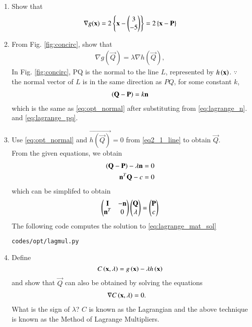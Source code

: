 \begin{enumerate}[label=\thesubsection.\arabic*.,ref=\thesubsection.\theenumi]
\item Show that 
\begin{align}
\nabla g(\mathbf{x}) = 2\left\{\mathbf{x}-\begin{pmatrix}3 \\ -5\end{pmatrix}\right\} = 2\left\{\mathbf{x}-\mathbf{P}\right\}
\label{eq:lagrange_pq}
\end{align}
%
\item From Fig. \ref{fig:concirc}, show that 
\begin{align}
\label{eq:opt_normal}
\nabla g(\vec{Q}) = \lambda \nabla h(\vec{Q}),
\end{align}
%
\solution In Fig. \ref{fig:concirc}, PQ is the normal to the line $L$, represented by $h\left(\mathbf{x}\right)$. 
$\because$ the normal vector of $L$ is in the same direction as $PQ$,  for some constant $k$, 
%
\begin{align}
\left(\mathbf{Q}-\mathbf{P}\right) = k \mathbf{n}
\end{align}
%
which is the same as \eqref{eq:opt_normal} after substituting from \eqref{eq:lagrange_n}.
 and \eqref{eq:lagrange_pq}.
\item Use \eqref{eq:opt_normal} and $\vec{h(\vec{Q})}=0$ from \eqref{eq2_1_line} to obtain $\vec{Q}$.
\\
\solution From the given equations, we obtain
\begin{align}
\left(\mathbf{Q}-\mathbf{P}\right)-\lambda \mathbf{n} &= 0 
\\
\mathbf{n}^T\mathbf{Q} - c &= 0
\label{eq:lagrange_mat_eq}
\end{align}
%
which can be simplifed to obtain
%
\begin{align}
\begin{pmatrix}\mathbf{I} & -\mathbf{n} \\ \mathbf{n}^T & 0\end{pmatrix}\begin{pmatrix}\mathbf{Q}\\ \lambda\end{pmatrix} = \begin{pmatrix}\mathbf{P}\\c\end{pmatrix}
\label{eq:lagrange_mat_sol}
\end{align}
The following code computes the solution to \eqref{eq:lagrange_mat_sol}
%
\begin{lstlisting}
codes/opt/lagmul.py
\end{lstlisting}

\item
\label{lagrange}
	Define 
	\begin{equation}
	\label{lagrangian}
	C\brak{\mbf{x},\lambda} = g\brak{\mbf{x}} - \lambda h\brak{\mbf{x}}%
	\end{equation}
and show that $\vec{Q}$ can also be obtained by 
solving the equations
%
\begin{align}
\nabla C\left(\mathbf{x},\lambda\right) &= 0.
\label{tangent}
\end{align}
%
What is the sign of $\lambda$?  $C$ is known as the Lagrangian and the above technique is known as the Method of Lagrange Multipliers.


\end{enumerate}
